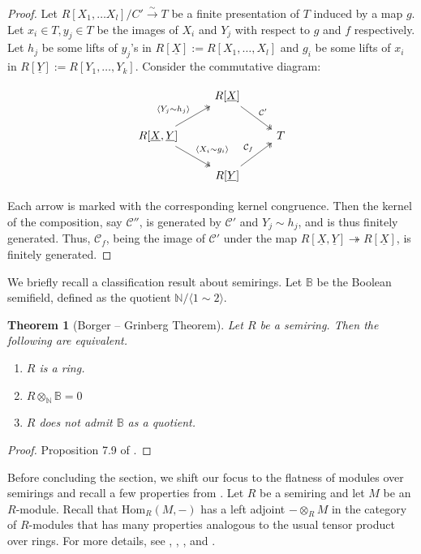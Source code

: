 \documentclass[notitlepage, 10pt]{article}
\theoremstyle{defin}
\theoremstyle{theo}
\newtheorem{thm}[defn]{Theorem}
\theoremstyle{rema}
\newcommand{\N}{\mathbb{N}}
\newcommand{\bB}{\mathbb{B}}
\newcommand{\cC}{\mathcal{C}}
\begin{document}
\begin{proof}
    Let $R[X_1,\ldots X_l]/C'\xrightarrow{\sim} T$ be a finite presentation of $T$ induced by a map $g$. Let $x_i\in T, y_j\in T$ be the images of $X_i$ and $Y_j$ with respect to $g$ and $f$ respectively. Let $h_j$ be some lifts of $y_j$'s in $R[\underline{X}] := R[X_1,\ldots,X_l]$ and $g_i$ be some lifts of $x_i$ in $R[\underline{Y}] :=R[Y_1,\ldots,Y_k]$. Consider the commutative diagram:

        \begin{equation}
            \begin{tikzcd}
                       & R[\underline{X}] \arrow[rd, twoheadrightarrow, "\cC'"]& \\
            R[\underline{X}, \underline{Y}] \arrow[ru, twoheadrightarrow, "\langle Y_j\sim h_j\rangle "] \arrow[rd, twoheadrightarrow, "\langle X_i\sim g_i \rangle"] & & T \\
                       & R[\underline{Y}] \arrow[ru, twoheadrightarrow, "\cC_f"]&       
            \end{tikzcd}
        \end{equation}
        
    Each arrow is marked with the corresponding kernel congruence. Then the kernel of the composition, say $\cC''$, is generated by $\cC'$ and $Y_j\sim h_j$, and is thus finitely generated. Thus, $\cC_f$, being the image of $\cC'$ under the map $R[\underline{X}, \underline{Y}]\twoheadrightarrow R[\underline{X}]$, is finitely generated.
\end{proof}

We briefly recall a classification result about semirings. Let $\bB$ be the Boolean semifield, defined as the quotient $\N/\langle 1 \sim 2\rangle$.

\begin{thm}[Borger -- Grinberg Theorem]\label{thBJ}
    Let $R$ be a semiring. Then the following are equivalent.
    \begin{enumerate}
        \item $R$ is a ring.
        \item $R\otimes_\N \bB = 0$
        \item $R$ does not admit $\bB$ as a quotient.
    \end{enumerate}
\end{thm}

\begin{proof}
    Proposition 7.9 of \cite{Borger_2015}.    
\end{proof}
Before concluding the section, we shift our focus to the flatness of modules over semirings and recall a few properties from \cite{borger_jun_semiring}. Let $R$ be a semiring and let $M$ be an $R$-module. Recall that $\mathrm{Hom}_R(M,-)$ has a left adjoint $-\otimes_R M$ in the category of $R$-modules that has many properties analogous to the usual tensor product over rings. For more details, see \cite{Borger2016}, \cite{borger_jun_semiring}, \cite{katsov2004}, and \cite{ToenVaquie2009}.
\end{document}
